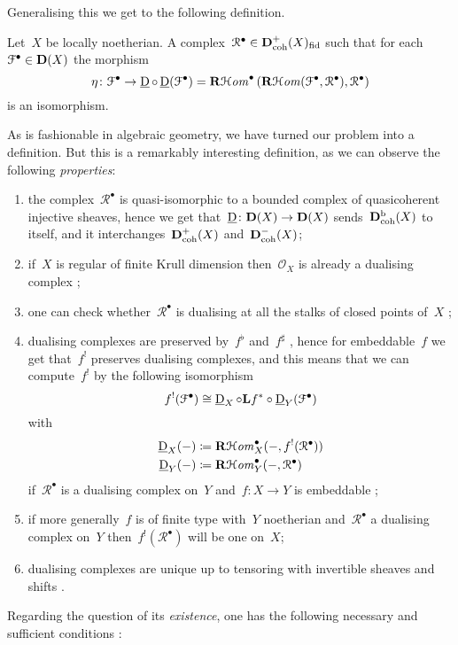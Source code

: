 \documentclass[10pt,a4paper]{article}
\begin{document}
Generalising this we get to the following definition.
\begin{definition}
  Let~$X$ be locally noetherian. A complex~$\mathcal{R}^\bullet\in\mathbf{D}_{\mathrm{coh}}^+(X)_{\mathrm{fid}}$ such that for each~$\mathcal{F}^\bullet\in\mathbf{D}(X)$ the morphism
  \begin{equation}
    \eta\colon\mathcal{F}^\bullet\to\operatorname{\underline{D}}\circ\operatorname{\underline{D}}(\mathcal{F}^\bullet)=\operatorname{\mathbf{R}\mathcal{H}\mathit{om}}^\bullet\left( \operatorname{\mathbf{R}\mathcal{H}\mathit{om}}(\mathcal{F}^\bullet,\mathcal{R}^\bullet),\mathcal{R}^\bullet \right)
  \end{equation}
  is an isomorphism.
\end{definition}
As is fashionable in algebraic geometry, we have turned our problem into a definition. But this is a remarkably interesting definition, as we can observe the following \emph{properties}:
\begin{enumerate}
  \item the complex~$\mathcal{R}^\bullet$ is quasi-isomorphic to a bounded complex of quasicoherent injective sheaves, hence we get that~$\operatorname{\underline{D}}\colon\mathbf{D}(X)\to\mathbf{D}(X)$ sends~$\mathbf{D}_{\mathrm{coh}}^{\mathrm{b}}(X)$ to itself, and it interchanges~$\mathbf{D}_{\mathrm{coh}}^+(X)$ and~$\mathbf{D}_{\mathrm{coh}}^-(X)$;
  \item if~$X$ is regular of finite Krull dimension then~$\mathcal{O}_X$ is already a dualising complex \cite[example V.2.2]{hartshorne-residues-and-duality};
  \item one can check whether~$\mathcal{R}^\bullet$ is dualising at all the stalks of closed points of~$X$ \cite[corollary V.2.3]{hartshorne-residues-and-duality};
  \item dualising complexes are preserved by~$f^\flat$ and~$f^\sharp$ \cite[proposition V.2.4 and theorem V.8.3]{hartshorne-residues-and-duality}, hence for embeddable~$f$ we get that~$f^!$ preserves dualising complexes, and this means that we can compute~$f^!$ by the following isomorphism
    \begin{equation}
      f^!(\mathcal{F}^\bullet)\cong\operatorname{\underline{D}}_X\circ\mathbf{L} f^*\circ\operatorname{\underline{D}}_Y(\mathcal{F}^\bullet)
    \end{equation}
    with
    \begin{equation}
      \begin{aligned}
        \operatorname{\underline{D}}_X(-)&\coloneqq\operatorname{\mathbf{R}\mathcal{H}\mathit{om}}_X^\bullet(-,f^!(\mathcal{R}^\bullet)) \\
        \operatorname{\underline{D}}_Y(-)&\coloneqq\operatorname{\mathbf{R}\mathcal{H}\mathit{om}}_Y^\bullet(-,\mathcal{R}^\bullet)
      \end{aligned}
    \end{equation}
    if~$\mathcal{R}^\bullet$ is a dualising complex on~$Y$ and~$f\colon X\to Y$ is embeddable \cite[proposition V.8.5]{hartshorne-residues-and-duality};
  \item if more generally~$f$ is of finite type with~$Y$ noetherian and~$\mathcal{R}^\bullet$ a dualising complex on~$Y$ then~$f^!(\mathcal{R}^\bullet)$ will be one on~$X$;
  \item dualising complexes are unique up to tensoring with invertible sheaves and shifts \cite[theorem V.3.1]{hartshorne-residues-and-duality}.
\end{enumerate}
Regarding the question of its \emph{existence}, one has the following necessary and sufficient conditions \cite[\S V.10]{hartshorne-residues-and-duality}:
\end{document}
